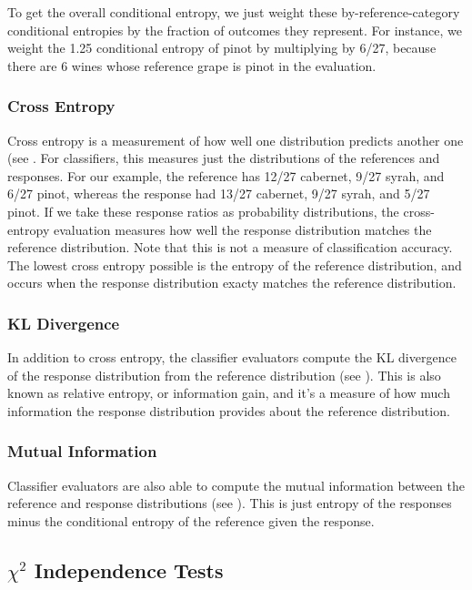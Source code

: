To get the overall conditional entropy, we just weight these
by-reference-category conditional entropies by the fraction of
outcomes they represent.  For instance, we weight the 1.25 conditional
entropy of pinot by multiplying by 6/27, because there are 6 wines
whose reference grape is pinot in the evaluation.

\subsubsection{Cross Entropy}

Cross entropy is a measurement of how well one distribution predicts
another one (see .  For classifiers, this
measures just the distributions of the references and responses.  For
our example, the reference has 12/27 cabernet, 9/27 syrah, and 6/27
pinot, whereas the response had 13/27 cabernet, 9/27 syrah, and 5/27
pinot.  If we take these response ratios as probability distributions,
the cross-entropy evaluation measures how well the response
distribution matches the reference distribution.  Note that this is
not a measure of classification accuracy.  The lowest cross entropy
possible is the entropy of the reference distribution, and occurs when
the response distribution exacty matches the reference distribution.

\subsubsection{KL Divergence}

In addition to cross entropy, the classifier evaluators compute the KL
divergence of the response distribution from the reference
distribution (see ).  This is also known as
relative entropy, or information gain, and it's a measure of how much
information the response distribution provides about the reference
distribution.

\subsubsection{Mutual Information}

Classifier evaluators are also able to compute the mutual information
between the reference and response distributions (see
).  This is just entropy of the
responses minus the conditional entropy of the reference given the
response.  


\subsection{$\chi^2$ Independence Tests}

